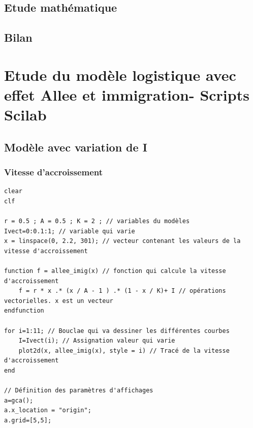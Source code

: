 \documentclass{article}
\begin{document}
\paragraph{}

\subsection{Etude mathématique}

\subsection{Bilan}
\paragraph{}


\newpage
\appendix

\section{Etude du modèle logistique avec effet Allee et immigration- Scripts Scilab}

\subsection{Modèle avec variation de I}

\subsubsection{Vitesse d'accroissement}

\begin{verbatim}
clear
clf

r = 0.5 ; A = 0.5 ; K = 2 ; // variables du modèles
Ivect=0:0.1:1; // variable qui varie
x = linspace(0, 2.2, 301); // vecteur contenant les valeurs de la vitesse d'accroissement

function f = allee_imig(x) // fonction qui calcule la vitesse d'accroissement
    f = r * x .* (x / A - 1 ) .* (1 - x / K)+ I // opérations vectorielles. x est un vecteur
endfunction

for i=1:11; // Bouclae qui va dessiner les différentes courbes
    I=Ivect(i); // Assignation valeur qui varie
    plot2d(x, allee_imig(x), style = i) // Tracé de la vitesse d'accroissement
end

// Définition des paramètres d'affichages
a=gca();
a.x_location = "origin";
a.grid=[5,5];
\end{verbatim}
\end{document}
